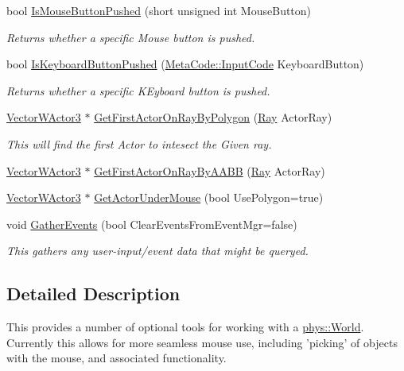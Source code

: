 \begin{DoxyCompactItemize}
bool \hyperlink{classphys_1_1WorldQueryTool_af277b578432dfaefffbc4fd9bb80ca64}{IsMouseButtonPushed} (short unsigned int MouseButton)
\begin{DoxyCompactList}\small\item\em Returns whether a specific Mouse button is pushed. \item\end{DoxyCompactList}\item 
bool \hyperlink{classphys_1_1WorldQueryTool_a8343f54b900adb316ddc6de5405da328}{IsKeyboardButtonPushed} (\hyperlink{classphys_1_1MetaCode_a3e501cbb5bf0f6f1fdb7211465bda8d8}{MetaCode::InputCode} KeyboardButton)
\begin{DoxyCompactList}\small\item\em Returns whether a specific KEyboard button is pushed. \item\end{DoxyCompactList}\item 
\hyperlink{classphys_1_1VectorWActor3}{VectorWActor3} $\ast$ \hyperlink{classphys_1_1WorldQueryTool_a7921889d3bb3fbf74e37ee87bd9f4de4}{GetFirstActorOnRayByPolygon} (\hyperlink{classphys_1_1Ray}{Ray} ActorRay)
\begin{DoxyCompactList}\small\item\em This will find the first Actor to intesect the Given ray. \item\end{DoxyCompactList}\item 
\hyperlink{classphys_1_1VectorWActor3}{VectorWActor3} $\ast$ \hyperlink{classphys_1_1WorldQueryTool_abaa9f42bc286d1d87b00c65e1212d852}{GetFirstActorOnRayByAABB} (\hyperlink{classphys_1_1Ray}{Ray} ActorRay)
\item 
\hyperlink{classphys_1_1VectorWActor3}{VectorWActor3} $\ast$ \hyperlink{classphys_1_1WorldQueryTool_a3ee3394dccd1d1c844e346ec78ad1fa9}{GetActorUnderMouse} (bool UsePolygon=true)
\item 
void \hyperlink{classphys_1_1WorldQueryTool_ae387ff047f3cdf408d8959b8cbf4cc57}{GatherEvents} (bool ClearEventsFromEventMgr=false)
\begin{DoxyCompactList}\small\item\em This gathers any user-\/input/event data that might be queryed. \item\end{DoxyCompactList}\end{DoxyCompactItemize}


\subsection{Detailed Description}
This provides a number of optional tools for working with a \hyperlink{classphys_1_1World}{phys::World}. Currently this allows for more seamless mouse use, including 'picking' of objects with the mouse, and associated functionality. 

